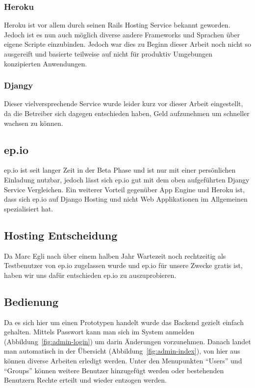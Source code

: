 \subsubsection{Heroku} %
\label{ssub:Heroku}
Heroku ist vor allem durch seinen Rails Hosting Service bekannt geworden. Jedoch ist es nun auch möglich diverse andere Frameworks und Sprachen über eigene Scripte einzubinden. Jedoch war dies zu Beginn dieser Arbeit noch nicht so ausgereift und basierte teilweise auf nicht für produktiv Umgebungen konzipierten Anwendungen.

\subsubsection{Djangy} %
\label{ssub:Djangy}
Dieser vielversprechende Service wurde leider kurz vor dieser Arbeit eingestellt, da die Betreiber sich dagegen entschieden haben, Geld aufzunehmen um schneller wachsen zu können.

\subsection{ep.io} %
\label{sub:ep.io}
ep.io ist seit langer Zeit in der Beta Phase und ist nur mit einer persönlichen Einladung nutzbar, jedoch lässt sich ep.io gut mit dem oben aufgeführten Djangy Service Vergleichen. Ein weiterer Vorteil gegenüber App Engine und Heroku ist, dass sich ep.io auf Django Hosting und nicht Web Applikationen im Allgemeinen spezialisiert hat.


\subsection{Hosting Entscheidung} %
\label{sub:Hosting Entscheidung}
Da Marc Egli nach über einem halben Jahr Wartezeit noch rechtzeitig als Testbenutzer von ep.io zugelassen wurde und ep.io für unsere Zwecke gratis ist, haben wir uns dafür entschieden ep.io zu auszuprobieren.

\subsection{Bedienung} %
\label{sub:Bedienung}
Da es sich hier um einen Prototypen handelt wurde das Backend gezielt einfach gehalten. Mittels Passwort kann man sich im System anmelden (Abbildung~\ref{fig:admin-login}) um darin Änderungen vorzunehmen. Danach landet man automatisch in der Übersicht (Abbildung~\ref{fig:admin-index}), von hier aus können diverse Arbeiten erledigt werden. Unter den Menupunkten "`Users"' und "`Groups"' können weitere Benutzer hinzugefügt werden oder bestehenden Benutzern Rechte erteilt und wieder entzogen werden.

